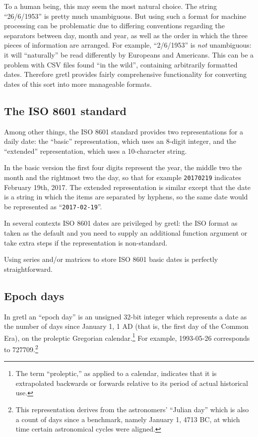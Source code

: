 To a human being, this may seem the most natural choice.  The string
``26/6/1953'' is pretty much unambiguous. But using such a format for
machine processing can be problematic due to differing conventions
regarding the separators between day, month and year, as well as the
order in which the three pieces of information are arranged.  For
example, ``2/6/1953'' is \textit{not} unambiguous: it will
``naturally'' be read differently by Europeans and Americans. This can
be a problem with CSV files found ``in the wild'', containing
arbitrarily formatted dates. Therefore gretl provides fairly
comprehensive functionality for converting dates of this sort into
more manageable formats.

\subsection{The ISO 8601 standard}
\label{sec:cal-ISO8601}

Among other things, the ISO 8601 standard provides two representations
for a daily date: the ``basic'' representation, which uses an 8-digit
integer, and the ``extended'' representation, which uses a
10-character string.

In the basic version the first four digits represent the year, the
middle two the month and the rightmost two the day, so that for
example \texttt{20170219} indicates February 19th, 2017. The extended
representation is similar except that the date is a string in which
the items are separated by hyphens, so the same date would be
represented as ``\texttt{2017-02-19}''.

In several contexts ISO 8601 dates are privileged by gretl: the ISO
format as taken as the default and you need to supply an additional
function argument or take extra steps if the representation is
non-standard.

Using series and/or matrices to store ISO 8601 basic dates is
perfectly straightforward.

\subsection{Epoch days}
\label{sec:cal-epochday}

In gretl an ``epoch day'' is an unsigned 32-bit integer which
represents a date as the number of days since January 1, 1 AD (that
is, the first day of the Common Era), on the proleptic Gregorian
calendar.\footnote{The term ``proleptic,'' as applied to a calendar,
  indicates that it is extrapolated backwards or forwards relative to
  its period of actual historical use.} For example, 1993-05-26
corresponds to 727709.\footnote{This representation derives from the
  astronomers' ``Julian day'' which is also a count of days since a
  benchmark, namely January 1, 4713 BC, at which time certain
  astronomical cycles were aligned.}

